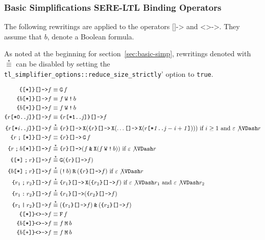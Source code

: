 \documentclass[a4paper,twoside,10pt,DIV=12]{scrreprt}
\DeclareMathOperator{\F}{\texttt{F}}
\DeclareMathOperator{\G}{\texttt{G}}
\newcommand{\R}{\mathbin{\texttt{R}}}
\DeclareMathOperator{\X}{\texttt{X}}
\newcommand{\M}{\mathbin{\texttt{M}}}
\newcommand{\W}{\mathbin{\texttt{W}}}
\DeclareMathOperator{\NOT}{\texttt{!}}
\newcommand{\OR}{\mathbin{\texttt{|}}}
\newcommand{\AND}{\mathbin{\texttt{\&}}}
\newcommand{\FUSION}{\mathbin{\texttt{:}}}
\newcommand{\CONCAT}{\mathbin{\texttt{;}}}
\newcommand{\0}{\texttt{0}}
\newcommand{\1}{\texttt{1}}
\newcommand{\STAR}[1]{\texttt{[*#1]}}
\newcommand{\PLUS}{\texttt{[+]}}
\newcommand{\Esuffix}{\texttt{<>->}}
\newcommand{\Asuffix}{\texttt{[]->}}
\newcommand{\sere}[1]{\texttt{\{}#1\texttt{\}}}
\newcommand{\equiV}{\stackrel{\star}{\equiv}}
\newcommand\mvar[1]{\ensuremath{\mathit{#1}}}
\begin{document}
\subsubsection{Basic Simplifications SERE-LTL Binding Operators}

The following rewritings are applied to the operators $\Asuffix$ and
$\Esuffix$.  They assume that $b$, denote a Boolean formula.

As noted at the beginning for section~\ref{sec:basic-simp}, rewritings
denoted with $\equiV$ can be disabled by setting the
\verb|tl_simplifier_options::reduce_size_strictly|' option to
\texttt{true}.

\begin{align*}
  \sere{\STAR{}}\Asuffix f &\equiv \G f\\
  \sere{b\STAR{}}\Asuffix f &\equiv f \W \NOT b\\
  \sere{b\PLUS{}}\Asuffix f &\equiv f \W \NOT b\\
  \sere{r\STAR{0..\mvar{j}}}\Asuffix f &\equiv \sere{r\STAR{1..\mvar{j}}}\Asuffix f \\
  \sere{r\STAR{\mvar{i}..\mvar{j}}}\Asuffix f &\equiV
    \sere{r}\Asuffix \X(
    \sere{r}\Asuffix \X(\ldots
    \Asuffix\X(r\STAR{\mvar{1}..\mvar{j-i+1}})))
    \text{~if~}i\ge 1\text{~and~}\varepsilon\not\VDash r\\
  \sere{r\CONCAT \STAR{}}\Asuffix f &\equiv \sere{r}\Asuffix \G f\\
  \sere{r\CONCAT b\STAR{}}\Asuffix f &\equiV \sere{r}\Asuffix (f\AND \X(f \W \NOT b)) \text{~if~}\varepsilon\not\VDash r\\
  \sere{\STAR{}\CONCAT r}\Asuffix f &\equiV \G(\sere{r}\Asuffix f)\\
  \sere{b\STAR{}\CONCAT r}\Asuffix f &\equiV (\NOT b)\R(\sere{r}\Asuffix f) \text{~if~}\varepsilon\not\VDash r\\
  \sere{r_1\CONCAT r_2}\Asuffix f &\equiV \sere{r_1}\Asuffix\X(\sere{r_2}\Asuffix f)\text{~if~}\varepsilon\not\VDash r_1\text{~and~}\varepsilon\not\VDash r_2\\
  \sere{r_1\FUSION r_2}\Asuffix f &\equiV \sere{r_1}\Asuffix(\sere{r_2}\Asuffix f)\\
  \sere{r_1\OR r_2}\Asuffix f &\equiV (\sere{r_1}\Asuffix f)\AND(\sere{r_2}\Asuffix f)\\
  \sere{\STAR{}}\Esuffix f &\equiv \F f\\
  \sere{b\STAR{}}\Esuffix f &\equiv f \M b\\
  \sere{b\PLUS{}}\Esuffix f &\equiv f \M b\\

\end{align*}
\end{document}
